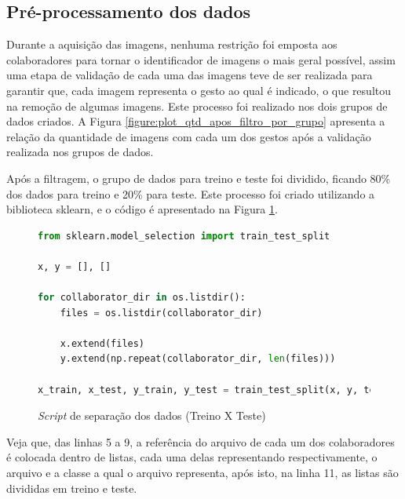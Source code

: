\subsection{Pré-processamento dos dados}

\par Durante a aquisição das imagens, nenhuma restrição foi emposta aos colaboradores para tornar o identificador de imagens o mais geral possível, assim uma etapa de validação de cada uma das imagens teve de ser realizada para garantir que, cada imagem representa o gesto ao qual é indicado, o que resultou na remoção de algumas imagens. Este processo foi realizado nos dois grupos de dados criados. A Figura \ref{figure:plot_qtd_apos_filtro_por_grupo} apresenta a relação da quantidade de imagens com cada um dos gestos após a validação realizada nos grupos de dados. 


\par Após a filtragem, o grupo de dados para treino e teste foi dividido, ficando 80\% dos dados para treino e 20\% para teste. Este processo foi criado utilizando a biblioteca sklearn, e o código é apresentado na Figura \ref{figure:split_train_test_data}.

\begin{figure}[H]
    \centering
    \begin{lstlisting}[language=Python]
from sklearn.model_selection import train_test_split

x, y = [], []

for collaborator_dir in os.listdir():
    files = os.listdir(collaborator_dir)

    x.extend(files)
    y.extend(np.repeat(collaborator_dir, len(files)))

x_train, x_test, y_train, y_test = train_test_split(x, y, test_size=0.20, random_state=992)    
\end{lstlisting}
    \caption{\textit{Script} de separação dos dados (Treino X Teste)}
    \label{figure:split_train_test_data}
\end{figure}

\par Veja que, das linhas 5 a 9, a referência do arquivo de cada um dos colaboradores é colocada dentro de listas, cada uma delas representando respectivamente, o arquivo e a classe a qual o arquivo representa, após isto, na linha 11, as listas são divididas em treino e teste.

